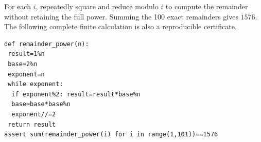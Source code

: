 For each $i$, repeatedly square and reduce modulo $i$ to compute the remainder without retaining the full power. Summing the 100 exact remainders gives $\boxed{1576}$. The following complete finite calculation is also a reproducible certificate.
\begin{verbatim}
def remainder_power(n):
 result=1%n
 base=2%n
 exponent=n
 while exponent:
  if exponent%2: result=result*base%n
  base=base*base%n
  exponent//=2
 return result
assert sum(remainder_power(i) for i in range(1,101))==1576
\end{verbatim}
